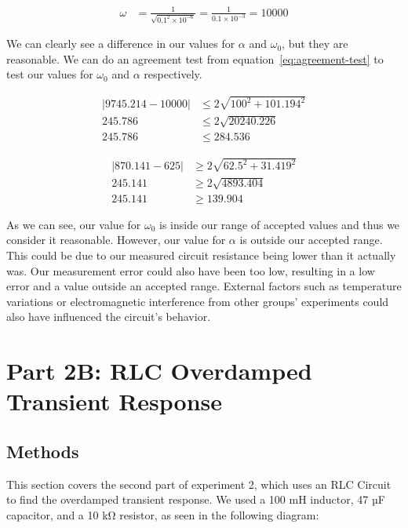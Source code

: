 \documentclass[11pt]{article}
\let\oldsection\section
\renewcommand\section{\clearpage\oldsection}
\begin{document}
    \begin{align*}
        \omega &= \frac{1}{\sqrt{0.1^2 \times 10^{-6}}} = \frac{1}{0.1 \times 10^{-3}} = 10000
    \end{align*}

    We can clearly see a difference in our values for \( \alpha \) and \( \omega_0 \), but they are reasonable. We can do an agreement test from equation~\ref{eq:agreement-test} to test our values for \( \omega_0 \) and \( \alpha \) respectively.

    \begin{e}
        \begin{align*}
            |9745.214 - 10000| &\le 2 \sqrt{100^2 + 101.194^2} \\
            245.786 &\le 2 \sqrt{20240.226} \\
            245.786 &\le 284.536
        \end{align*}
    \end{e}
    \begin{e}
        \begin{align*}
            |870.141 - 625| &\ge 2 \sqrt{62.5^2 + 31.419^2} \\
            245.141 &\ge 2 \sqrt{4893.404} \\
            245.141 &\ge 139.904
        \end{align*}
    \end{e}

    As we can see, our value for \( \omega_0 \) is inside our range of accepted values and thus we consider it reasonable. However, our value for \( \alpha \) is outside our accepted range. This could be due to our measured circuit resistance being lower than it actually was. Our measurement error could also have been too low, resulting in a low error and a value outside an accepted range. External factors such as temperature variations or electromagnetic interference from other groups' experiments could also have influenced the circuit's behavior.


    \section{Part 2B: RLC Overdamped Transient Response}\label{sec:part2b_overdamped}
    \subsection{Methods}\label{subsec:part2b_methods}
    This section covers the second part of experiment 2, which uses an RLC Circuit to find the overdamped transient response. We used a 100 mH inductor, 47 µF capacitor, and a 10 kΩ resistor, as seen in the following diagram:
\end{document}
